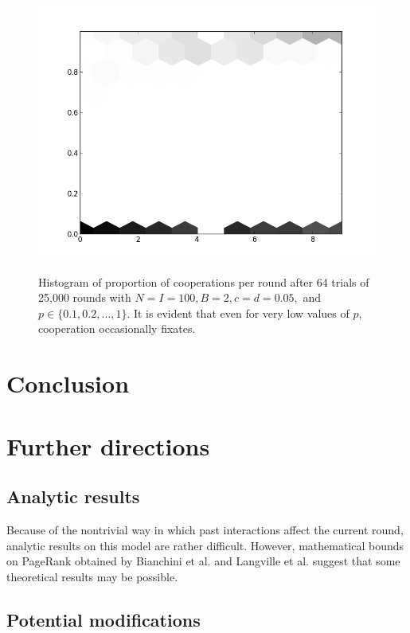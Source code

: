\documentclass{amsart}
\begin{document}
\begin{figure}[h]
\caption{Histogram of proportion of cooperations per round after 64
  trials of 25,000 rounds with $N=I=100, B=2,c=d=0.05,$ and $p \in
  \{0.1,0.2,\dots,1\}$. It is evident that even for very low values of
  $p$, cooperation occasionally fixates.}

\includegraphics[width=\textwidth]{GOS.png}
\label{fig:gos}
\end{figure}

\section{Conclusion}
\label{sec:conclusion}

\section{Further directions}

\subsection{Analytic results}

Because of the nontrivial way in which past interactions affect the
current round, analytic results on this model are rather
difficult. However, mathematical bounds on PageRank obtained by
Bianchini et al. \cite{bianchini_Inside_2005} and Langville et
al. \cite{langville_deeper_2004} suggest that some theoretical results
may be possible.

\subsection{Potential modifications}
\end{document}
